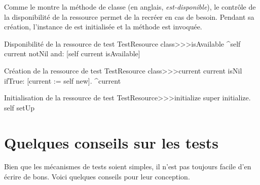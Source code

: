 \documentclass[a4paper,10pt,twoside]{book}
\begin{document}
{Comme le montre la méthode de classe  (en anglais, \emph{est-disponible}), le contrôle de la disponibilité de la ressource permet de la recréer en cas de besoin. 
Pendant sa création, l'instance de  est initialisée et la méthode  est invoquée.


\begin{method}[testresourceisavailable]{Disponibilité de la ressource de test}
TestResource class>>>isAvailable
	^self current notNil and: [self current isAvailable]
\end{method}
\begin{method}[testresourcecurrent]{Création de la ressource de test}
TestResource class>>>current
	current isNil ifTrue: [current := self new].
	^current
\end{method}
\begin{method}[restresourceinitialize]{Initialisation de la ressource de test}
TestResource>>>initialize
  super initialize.
	self setUp
\end{method}

\section{Quelques conseils sur les tests}

Bien que les mécanismes de tests soient simples, il n'est pas toujours
facile d'en écrire de bons.
Voici quelques conseils pour leur conception.

\begin{description}



\end{description}}
\end{document}
